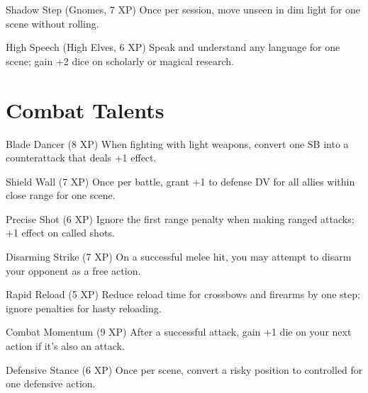 \documentclass[11pt]{article}
\begin{document}
\begin{talentbox}{Shadow Step (Gnomes, 7 XP)}
Once per session, move unseen in dim light for one scene without rolling.
\end{talentbox}

\begin{talentbox}{High Speech (High Elves, 6 XP)}
Speak and understand any language for one scene; gain +2 dice on scholarly or magical research.
\end{talentbox}

\section*{Combat Talents}

\begin{talentbox}{Blade Dancer (8 XP)}
When fighting with light weapons, convert one SB into a counterattack that deals +1 effect.
\end{talentbox}

\begin{talentbox}{Shield Wall (7 XP)}
Once per battle, grant +1 to defense DV for all allies within close range for one scene.
\end{talentbox}

\begin{talentbox}{Precise Shot (6 XP)}
Ignore the first range penalty when making ranged attacks; +1 effect on called shots.
\end{talentbox}

\begin{talentbox}{Disarming Strike (7 XP)}
On a successful melee hit, you may attempt to disarm your opponent as a free action.
\end{talentbox}

\begin{talentbox}{Rapid Reload (5 XP)}
Reduce reload time for crossbows and firearms by one step; ignore penalties for hasty reloading.
\end{talentbox}

\begin{talentbox}{Combat Momentum (9 XP)}
After a successful attack, gain +1 die on your next action if it's also an attack.
\end{talentbox}

\begin{talentbox}{Defensive Stance (6 XP)}
Once per scene, convert a risky position to controlled for one defensive action.
\end{talentbox}
\end{document}
